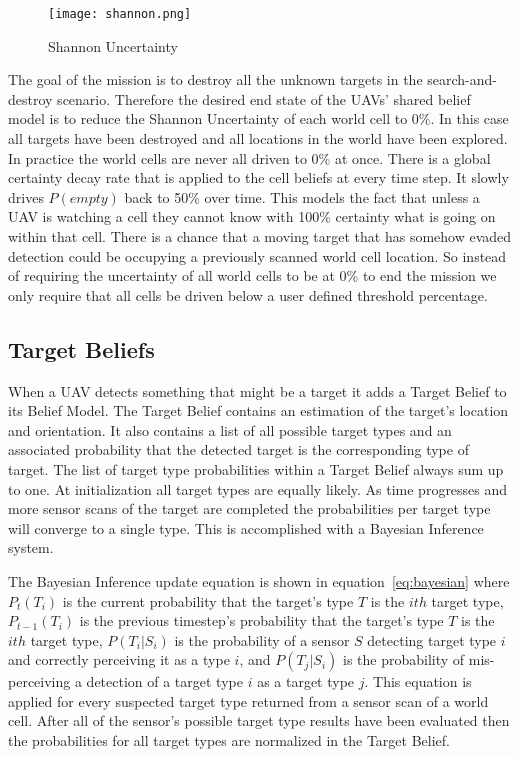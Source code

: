 \begin{multicols*}{2}

\begin{figure}[H]
	\centering
	\texttt{[image: shannon.png]}
	\caption{Shannon Uncertainty}
	\label{fig:shannon}
\end{figure}

The goal of the mission is to destroy all the unknown targets in the search-and-destroy scenario.  Therefore the desired end state of the UAVs' shared belief model is to reduce the Shannon Uncertainty of each world cell to 0\%.  In this case all targets have been destroyed and all locations in the world have been explored.  In practice the world cells are never all driven to 0\% at once.  There is a global certainty decay rate that is applied to the cell beliefs at every time step.  It slowly drives $P(empty)$ back to 50\% over time.  This models the fact that unless a UAV is watching a cell they cannot know with 100\% certainty what is going on within that cell.  There is a chance that a moving target that has somehow evaded detection could be occupying a previously scanned world cell location.  So instead of requiring the uncertainty of all world cells to be at 0\% to end the mission we only require that all cells be driven below a user defined threshold percentage.

\subsection{Target Beliefs}
When a UAV detects something that might be a target it adds a Target Belief to its Belief Model.  The Target Belief contains an estimation of the target's location and orientation.  It also contains a list of all possible target types and an associated probability that the detected target is the corresponding type of target. The list of target type probabilities within a Target Belief always sum up to one.  At initialization all target types are equally likely.  As time progresses and more sensor scans of the target are completed the probabilities per target type will converge to a single type.  This is accomplished with a Bayesian Inference system.  

The Bayesian Inference update equation is shown in equation~\ref{eq:bayesian} where $P_{t}(T_{i})$ is the current probability that the target's type $T$ is the $ith$ target type, $P_{t-1}(T_{i})$ is the previous timestep's probability that the target's type $T$ is the $ith$ target type, $P(T_{i}|S_{i})$ is the probability of a sensor $S$ detecting target type $i$ and correctly perceiving it as a type $i$, and $P(T_{j}|S_{i})$ is the probability of mis-perceiving a detection of a target type $i$ as a target type $j$.  This equation is applied for every suspected target type returned from a sensor scan of a world cell. After all of the sensor's possible target type results have been evaluated then the probabilities for all target types are normalized in the Target Belief.


\end{multicols*}
